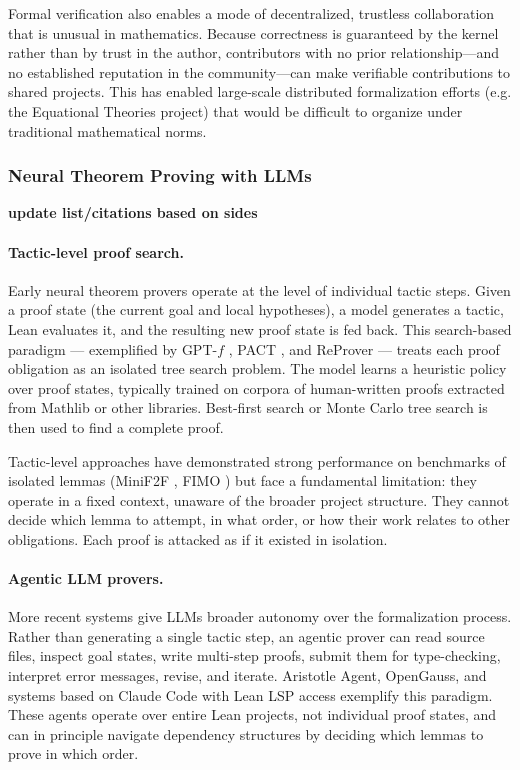 Formal verification also enables a mode of decentralized, trustless collaboration that is unusual in mathematics. Because correctness is guaranteed by the kernel rather than by trust in the author, contributors with no prior relationship---and no established reputation in the community---can make verifiable contributions to shared projects. This has enabled large-scale distributed formalization efforts (e.g. the Equational Theories project) that would be difficult to organize under traditional mathematical norms.



\subsubsection{Neural Theorem Proving with LLMs}
\textbf{update list/citations based on sides}
\paragraph{Tactic-level proof search.}
Early neural theorem provers operate at the level of individual tactic steps. Given a proof state (the current goal and local hypotheses), a model generates a tactic, Lean evaluates it, and the resulting new proof state is fed back. This search-based paradigm --- exemplified by GPT-$f$ \citep{polu2020generative}, PACT \citep{han2021proof}, and ReProver \citep{yang2023leandojo} --- treats each proof obligation as an isolated tree search problem. The model learns a heuristic policy over proof states, typically trained on corpora of human-written proofs extracted from Mathlib or other libraries. Best-first search or Monte Carlo tree search is then used to find a complete proof.

Tactic-level approaches have demonstrated strong performance on benchmarks of isolated lemmas (MiniF2F \citep{zheng2021minif2f}, FIMO \citep{liu2023fimo}) but face a fundamental limitation: they operate in a fixed context, unaware of the broader project structure. They cannot decide which lemma to attempt, in what order, or how their work relates to other obligations. Each proof is attacked as if it existed in isolation.

\paragraph{Agentic LLM provers.}
More recent systems give LLMs broader autonomy over the formalization process. Rather than generating a single tactic step, an agentic prover can read source files, inspect goal states, write multi-step proofs, submit them for type-checking, interpret error messages, revise, and iterate. Aristotle Agent, OpenGauss, and systems based on Claude Code with Lean LSP access exemplify this paradigm. These agents operate over entire Lean projects, not individual proof states, and can in principle navigate dependency structures by deciding which lemmas to prove in which order.

